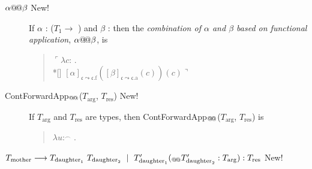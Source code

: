\begin{description}
  
\item[\textnormal{$\alpha\text{@\!@}\beta$} New!] \mbox{}

  If $\alpha$ : ($T_1\rightarrow$ ) 
                         and $\beta$ : 
                         then the \textit{combination of $\alpha$ and
    $\beta$  based on functional application}, $\alpha\text{@\!@}\beta$, is
  \begin{quote}
    $\ulcorner\lambda c$:
      . \\*[\baselineskip]
      \hspace*{10em}$[\alpha]_{\mathfrak{c}\leadsto\mathfrak{c}.\text{f}}([\beta]_{\mathfrak{c}\leadsto\mathfrak{c}.\text{a}}(c))(c)\urcorner$
    \end{quote}
    
\item[\textnormal{ContForwardApp$_{\text{@\!@}}$($T_{\text{arg}}$,
    $T_{\text{res}}$)} New!] \mbox{}

  If $T_{\text{arg}}$ and $T_{\text{res}}$ are types, then
  ContForwardApp$_{\text{@\!@}}$($T_{\text{arg}}$, $T_{\text{res}}$) is
\begin{quote}
  $\lambda
u$:$^{\frown}$ . \\
\hspace*{2em}

\end{quote}
  
\item[\textnormal{$T_{\text{mother}}\longrightarrow
    T_{\text{daughter}_1}\ T_{\text{daughter}_2}\ \mid\
    T_{\text{daughter}_1}'(_{\text{@\!@}}T_{\text{daughter}_2}':T_{\text{arg}}):T_{\text{res}}$}
  New!]
  \mbox{}


\end{description}
